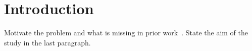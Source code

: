 \section{Introduction}
Motivate the problem and what is missing in prior work~\cite{example2024article,example2023book}.
State the aim of the study in the last paragraph.
